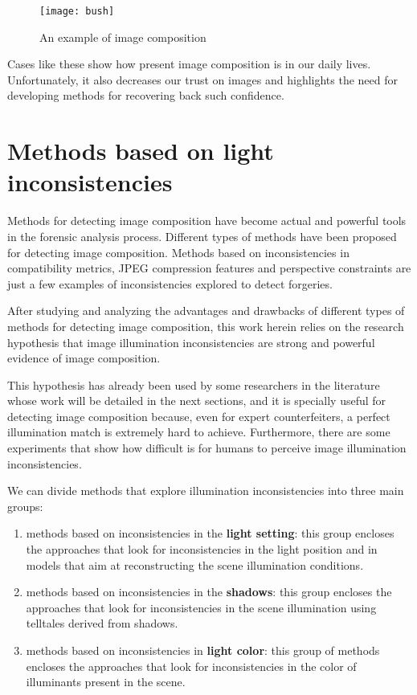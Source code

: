 \begin{wrapfigure}{r}{0.4\textwidth}
\vspace{-0.8cm}
  \begin{center}
    \texttt{[image: bush]}
  \end{center}
  \caption{An example of image composition}
  \vspace{-0.5cm}
\end{wrapfigure}

Cases like these show how present image composition is in our daily lives. Unfortunately, it also decreases our trust on images and highlights the need for developing methods for recovering back such confidence.

\section{Methods based on light inconsistencies}

Methods for detecting image composition have become actual and powerful tools in the forensic analysis process. Different types of methods have been proposed for detecting image composition. Methods based on inconsistencies in compatibility metrics, JPEG compression features and perspective constraints are just a few examples of inconsistencies explored to detect forgeries.

After studying and analyzing the advantages and drawbacks of different types of methods for detecting image composition, this work herein relies on the research hypothesis that image illumination inconsistencies are strong and powerful evidence of image composition.

This hypothesis has already been used by some researchers in the literature whose work will be detailed in the next sections, and it is specially useful for detecting image composition because, even for expert counterfeiters, a perfect illumination match is extremely hard to achieve. Furthermore, there are some experiments that show how difficult is for humans to perceive image illumination inconsistencies.

We can divide methods that explore illumination inconsistencies into three main groups:
\begin{enumerate}
\item methods based on inconsistencies in the \textbf{light setting}: this group encloses the approaches that look for inconsistencies in the light position and in models that aim at reconstructing the scene illumination conditions.
\item methods based on inconsistencies in the \textbf{shadows}: this group encloses the approaches that look for inconsistencies in the scene illumination using telltales derived from shadows.
\item methods based on inconsistencies in \textbf{light color}: this group of methods encloses the approaches that look for inconsistencies in the color of illuminants present in the scene.
\end{enumerate}


